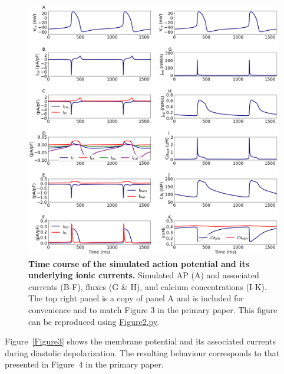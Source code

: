 \documentclass[fleqn,10pt]{physiome}
\begin{document}
\begin{figure}[htb]
\centering
\includegraphics[width=1\linewidth]{Figure2}
\caption{\textbf{Time course of the simulated action potential and its underlying ionic currents.}\newline
Simulated AP (A) and associated currents (B-F), fluxes (G \& H), and calcium concentrations (I-K). The top right panel is a copy of panel A and is included for convenience and to match Figure 3 in the primary paper. This figure can be reproduced using \href{https://models.physiomeproject.org/workspace/648/rawfile/6784d6c3256c832dc98b2db42c85747ae2596518/Figure2.py}{Figure2.py}.}
\label{Figure2}
\end{figure}

Figure~\ref{Figure3} shows the membrane potential and its associated currents during diastolic depolarization. The resulting behaviour corresponds to that presented in Figure~4 in the primary paper.
\end{document}
